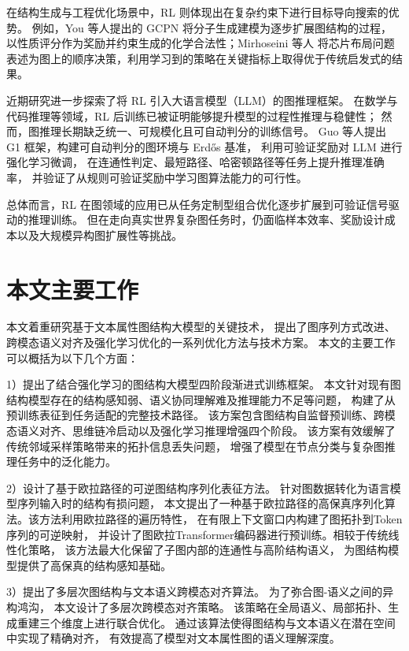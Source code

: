 在结构生成与工程优化场景中，RL 则体现出在复杂约束下进行目标导向搜索的优势。
例如，You 等人\cite{You2018GraphCP}提出的 GCPN 将分子生成建模为逐步扩展图结构的过程，
以性质评分作为奖励并约束生成的化学合法性；Mirhoseini 等人\cite{Mirhoseini2021AGP}
将芯片布局问题表述为图上的顺序决策，利用学习到的策略在关键指标上取得优于传统启发式的结果。

近期研究进一步探索了将 RL 引入大语言模型（LLM）的图推理框架。
在数学与代码推理等领域，RL 后训练已被证明能够提升模型的过程性推理与稳健性；
然而，图推理长期缺乏统一、可规模化且可自动判分的训练信号。
Guo 等人\cite{Guo2025G1TL}提出 G1 框架，构建可自动判分的图环境与 Erd\H{o}s 基准，
利用可验证奖励对 LLM 进行强化学习微调，
在连通性判定、最短路径、哈密顿路径等任务上提升推理准确率，
并验证了从规则可验证奖励中学习图算法能力的可行性。

总体而言，RL 在图领域的应用已从任务定制型组合优化逐步扩展到可验证信号驱动的推理训练。
但在走向真实世界复杂图任务时，仍面临样本效率、奖励设计成本以及大规模异构图扩展性等挑战。

\section{本文主要工作}

本文着重研究基于文本属性图结构大模型的关键技术，
提出了图序列方式改进、跨模态语义对齐及强化学习优化的一系列优化方法与技术方案。
本文的主要工作可以概括为以下几个方面：

1）提出了结合强化学习的图结构大模型四阶段渐进式训练框架。 
本文针对现有图结构模型存在的结构感知弱、语义协同理解难及推理能力不足等问题，
构建了从预训练表征到任务适配的完整技术路径。
该方案包含图结构自监督预训练、跨模态语义对齐、思维链冷启动以及强化学习推理增强四个阶段。
该方案有效缓解了传统邻域采样策略带来的拓扑信息丢失问题，
增强了模型在节点分类与复杂图推理任务中的泛化能力。

2）设计了基于欧拉路径的可逆图结构序列化表征方法。 
针对图数据转化为语言模型序列输入时的结构有损问题，
本文提出了一种基于欧拉路径的高保真序列化算法。该方法利用欧拉路径的遍历特性，
在有限上下文窗口内构建了图拓扑到Token序列的可逆映射，
并设计了图欧拉Transformer编码器进行预训练。相较于传统线性化策略，
该方法最大化保留了子图内部的连通性与高阶结构语义，
为图结构模型提供了高保真的结构感知基础。

3）提出了多层次图结构与文本语义跨模态对齐算法。
为了弥合图-语义之间的异构鸿沟，
本文设计了多层次跨模态对齐策略。
该策略在全局语义、局部拓扑、生成重建三个维度上进行联合优化。
通过该算法使得图结构与文本语义在潜在空间中实现了精确对齐，
有效提高了模型对文本属性图的语义理解深度。

